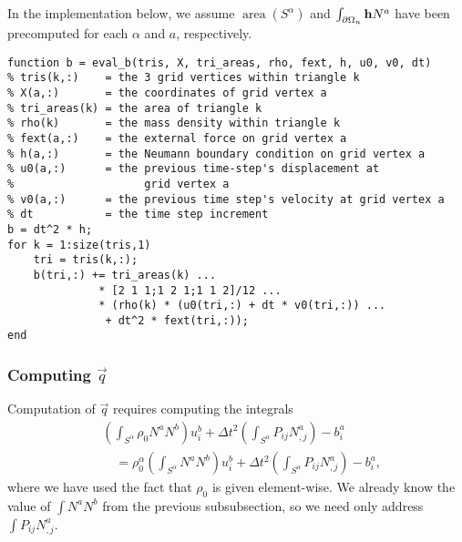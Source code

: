In the implementation below, we assume $\operatorname{area} \left( S^{\alpha} \right)$ and $\int_{\partial \Omega_n} \mathbf{h} N^a$ have been precomputed for each $\alpha$ and $a$, respectively.
\begin{verbatim}
function b = eval_b(tris, X, tri_areas, rho, fext, h, u0, v0, dt)
% tris(k,:)    = the 3 grid vertices within triangle k
% X(a,:)       = the coordinates of grid vertex a
% tri_areas(k) = the area of triangle k
% rho(k)       = the mass density within triangle k
% fext(a,:)    = the external force on grid vertex a
% h(a,:)       = the Neumann boundary condition on grid vertex a
% u0(a,:)      = the previous time-step's displacement at
%                    grid vertex a
% v0(a,:)      = the previous time step's velocity at grid vertex a
% dt           = the time step increment
b = dt^2 * h;
for k = 1:size(tris,1)
    tri = tris(k,:);
    b(tri,:) += tri_areas(k) ...
              * [2 1 1;1 2 1;1 1 2]/12 ...
              * (rho(k) * (u0(tri,:) + dt * v0(tri,:)) ...
               + dt^2 * fext(tri,:));
end
\end{verbatim}

\subsubsection{Computing $\vec{q}$}

Computation of $\vec{q}$ requires computing the integrals
\begin{equation*}
\begin{split}
& \left( \int_{S^{\alpha}} \rho_0 N^a N^b \right) u_i^b + \Delta t^2 \left( \int_{S^{\alpha}} P_{ij} N^a_{,j} \right) - b^a_i \\
& \quad = \rho_0^{\alpha} \left( \int_{S^{\alpha}} N^a N^b \right) u_i^b + \Delta t^2 \left( \int_{S^{\alpha}} P_{ij} N^a_{,j} \right) - b^a_i,
\end{split}
\end{equation*}
where we have used the fact that $\rho_0$ is given element-wise. We already know the value of $\int N^a N^b$ from the previous subsubsection, so we need only address $\int P_{ij} N^a_{,j}$.

